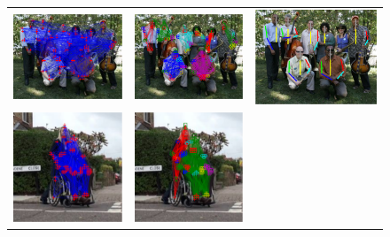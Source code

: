 \tabcolsep 1.5pt
\begin{figure}
  \centering
  \begin{tabular}{c c c }
  \includegraphics[width=0.31\linewidth]{imgidx_0063_init_graph.pdf}&
  \includegraphics[width=0.31\linewidth]{imgidx_0063_graph.pdf}&
  \includegraphics[width=0.31\linewidth]{imgidx_0063_sticks.pdf}
  \\
  \includegraphics[width=0.31\linewidth]{imgidx_0672_init_graph.pdf}&
  \includegraphics[width=0.31\linewidth]{imgidx_0672_graph.pdf}&

\end{tabular}
\end{figure}
